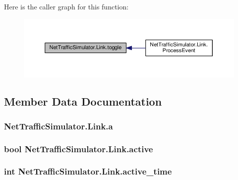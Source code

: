 Here is the caller graph for this function\-:\nopagebreak
\begin{figure}[H]
\begin{center}
\leavevmode
\includegraphics[width=350pt]{classNetTrafficSimulator_1_1Link_a06d3c8e29b67ae95c9d854c97cf48d1e_icgraph}
\end{center}
\end{figure}




\subsection{Member Data Documentation}
\hypertarget{classNetTrafficSimulator_1_1Link_a4b7875d945423d1f64c31d8156a3308d}{
\subsubsection[{a}]{ Net\-Traffic\-Simulator.\-Link.\-a\hspace{0.3cm}{\ttfamily [private]}}}\label{classNetTrafficSimulator_1_1Link_a4b7875d945423d1f64c31d8156a3308d}
\hypertarget{classNetTrafficSimulator_1_1Link_a1026cabe177ffe17054699706dea1452}{
\subsubsection[{active}]{\setlength{\rightskip}{0pt plus 5cm}bool Net\-Traffic\-Simulator.\-Link.\-active\hspace{0.3cm}{\ttfamily [private]}}}\label{classNetTrafficSimulator_1_1Link_a1026cabe177ffe17054699706dea1452}
\hypertarget{classNetTrafficSimulator_1_1Link_a9c09033d252b42f62a3857397c06e320}{
\subsubsection[{active\-\_\-time}]{\setlength{\rightskip}{0pt plus 5cm}int Net\-Traffic\-Simulator.\-Link.\-active\-\_\-time\hspace{0.3cm}{\ttfamily [private]}}}\label{classNetTrafficSimulator_1_1Link_a9c09033d252b42f62a3857397c06e320}
